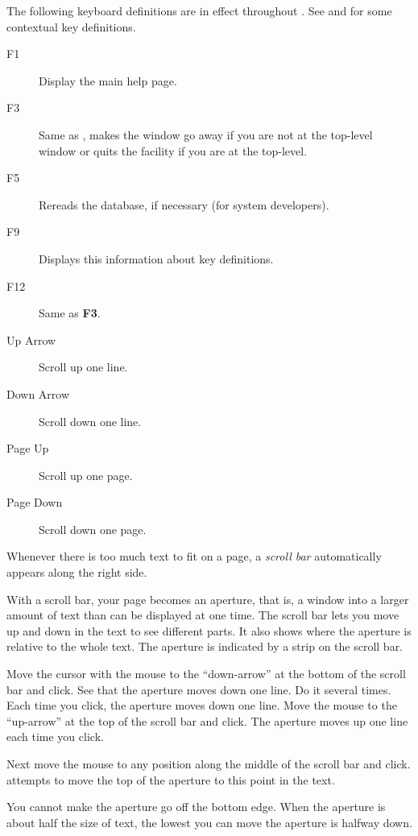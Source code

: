 The following keyboard definitions are in effect throughout
\HyperName{}.
See  and
for some contextual key definitions.
%
\begin{description}
\item[F1] Display the main help page.
\item[F3] Same as \StdExitButton{}, makes the window go away if you are not at the top-level window or quits the \HyperName{} facility if you are at the top-level.
\item[F5] Rereads the \HyperName{} database, if necessary (for system developers).
\item[F9] Displays this information about key definitions.
\item[F12] Same as {\bf F3}.
\item[Up Arrow] Scroll up one line.
\item[Down Arrow] Scroll down one line.
\item[Page Up] Scroll up one page.
\item[Page Down] Scroll down one page.
\end{description}

%

Whenever there is too much text to fit on a page, a {\it scroll
bar} automatically appears along the right side.

With a scroll bar, your page becomes an aperture, that is, a
window into a larger amount of text than can be displayed at one
time.
The scroll bar lets you move up and down in the text to see
different parts.
It also shows where the aperture is relative to the whole text.
The aperture is indicated by a strip on the scroll bar.

Move the cursor with the mouse to the ``down-arrow'' at the bottom
of the scroll bar and click.
See that the aperture moves down one line.
Do it several times.
Each time you click, the aperture moves down one line.
Move the mouse to the ``up-arrow'' at the top of the scroll bar and
click.
The aperture moves up one line each time you click.

Next move the mouse to any position along the middle of the scroll bar and
click.
\HyperName{} attempts to move the top of the aperture to this point in
the text.

You cannot make the aperture go off the bottom edge.
When the aperture is about half the size of text, the lowest you can move
the aperture is halfway down.

